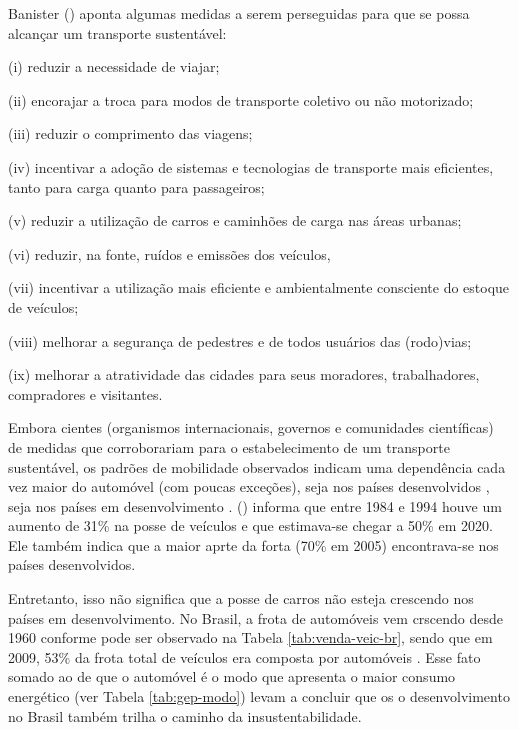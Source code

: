 Banister (\citeyear{BANISTER2005,BANISTER2008}) aponta algumas medidas a serem perseguidas para que se possa alcançar um transporte sustentável:
\begin{compactitem}[]
\item (i) reduzir a necessidade de viajar;
\item (ii) encorajar a troca para modos de transporte coletivo ou não motorizado;
\item (iii) reduzir o comprimento das viagens;
\item (iv) incentivar a adoção de sistemas e tecnologias de transporte mais eficientes, tanto para carga quanto para passageiros;
\item (v) reduzir a utilização de carros e caminhões de carga nas áreas urbanas;
\item (vi) reduzir, na fonte, ruídos e emissões dos veículos,
\item (vii) incentivar a utilização mais eficiente e ambientalmente consciente do estoque de veículos;
\item (viii) melhorar a segurança de pedestres e de todos usuários das (rodo)vias;
\item (ix) melhorar a atratividade das cidades para seus moradores, trabalhadores, compradores e visitantes.
\end{compactitem}

Embora cientes (organismos internacionais, governos e comunidades científicas) de medidas que corroborariam para o estabelecimento de um transporte sustentável, os padrões de mobilidade observados indicam uma dependência cada vez maior do automóvel (com poucas exceções), seja nos países desenvolvidos \cite{BANISTER2005}, seja nos países em desenvolvimento \cite{VASCONCELLOS2012}.  (\citeyear{BANISTER2005}) informa que entre 1984 e 1994 houve um aumento de 31\% na posse de veículos e que estimava-se chegar a 50\% em 2020. Ele também indica que a maior aprte da forta (70\% em 2005) encontrava-se nos países desenvolvidos.

Entretanto, isso não significa que a posse de carros não esteja crescendo nos países em desenvolvimento. No Brasil, a frota de automóveis vem crscendo desde 1960 conforme pode ser observado na Tabela \ref{tab:venda-veic-br}, sendo que em 2009, 53\% da frota total de veículos era composta por automóveis \cite{VASCONCELLOS2012}. Esse fato somado ao de que o automóvel é o modo que apresenta o maior consumo energético (ver Tabela \ref{tab:gep-modo}) levam a concluir que os o desenvolvimento no Brasil também trilha o caminho da insustentabilidade.

